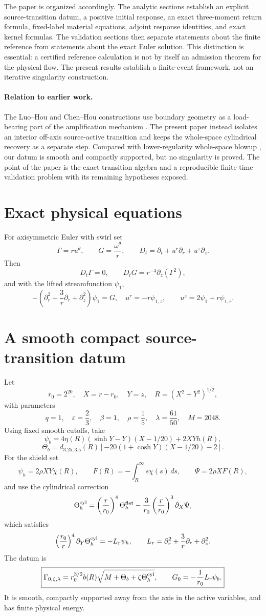 \documentclass[11pt]{article}
\theoremstyle{definition}\newtheorem{definition}[theorem]{Definition}\newtheorem{problem}[theorem]{Problem}
\theoremstyle{remark}\newtheorem{remark}[theorem]{Remark}
\begin{document}
The paper is organized accordingly.  The analytic sections establish an explicit source-transition datum, a positive initial response, an exact three-moment return formula, fixed-label material equations, adjoint response identities, and exact kernel formulas.  The validation sections then separate statements about the finite reference from statements about the exact Euler solution.  This distinction is essential: a certified reference calculation is not by itself an admission theorem for the physical flow.  The present results establish a finite-event framework, not an iterative singularity construction.

\paragraph{Relation to earlier work.}
The Luo--Hou and Chen--Hou constructions use boundary geometry as a load-bearing part of the amplification mechanism \cite{LuoHouPNAS2014,LuoHouMMS2014,ChenHou2025}.  The present paper instead isolates an interior off-axis source-active transition and keeps the whole-space cylindrical recovery as a separate step.  Compared with lower-regularity whole-space blowup \cite{Elgindi2021}, our datum is smooth and compactly supported, but no singularity is proved.  The point of the paper is the exact transition algebra and a reproducible finite-time validation problem with its remaining hypotheses exposed.
\section{Exact physical equations}
For axisymmetric Euler with swirl set
\[
\Gamma=ru^\theta,\qquad G=\frac{\omega^\theta}{r},\qquad
D_t=\partial_t+u^r\partial_r+u^z\partial_z.
\]
Then
\[
\boxed{D_t\Gamma=0},\qquad
\boxed{D_tG=r^{-4}\partial_z(\Gamma^2)},
\]
and with the lifted streamfunction $\psi_1$,
\[
-\left(\partial_r^2+\frac{3}{r}\partial_r+\partial_z^2\right)\psi_1=G,
\quad
u^r=-r\psi_{1,z},\qquad
u^z=2\psi_1+r\psi_{1,r}.
\]

\section{A smooth compact source-transition datum}
Let
\[
r_0=2^{20},\quad X=r-r_0,\quad Y=z,\quad R=(X^2+Y^2)^{1/2},
\]
with parameters
\[
q=1,\quad\varepsilon=\frac{2}{3},\quad\beta=1,\quad\rho=\frac{1}{5},
\quad\lambda=\frac{61}{50},\quad M=2048.
\]
Using fixed smooth cutoffs, take
\[
\psi_b=4\eta(R)(\sinh Y-Y)(X-1/20)+2XYh(R),
\]
\[
\Theta_b=d_{3.25,3.5}(R)\left[-20(1+\cosh Y)(X-1/20)-2\right].
\]
For the shield set
\[
\psi_h=2\rho XY\chi(R),\qquad
F(R)=-\int_R^\infty s\chi(s)\,ds,\qquad
\Psi=2\rho XF(R),
\]
and use the cylindrical correction
\[
\Theta_h^{\rm cyl}
=\left(\frac{r}{r_0}\right)^4\Theta_h^{\rm flat}
-\frac{3}{r_0}\left(\frac{r}{r_0}\right)^3\partial_X\Psi,
\]
which satisfies
\[
\left(\frac{r_0}{r}\right)^4\partial_Y\Theta_h^{\rm cyl}=-L_r\psi_h,
\qquad L_r=\partial_r^2+\frac{3}{r}\partial_r+\partial_z^2.
\]
The datum is
\[
\boxed{
\Gamma_{0,\zeta,\lambda}
=r_0^{3/2}b(R)\sqrt{M+\Theta_b+\zeta\Theta_h^{\rm cyl}},
\qquad
G_0=-\frac{1}{r_0}L_r\psi_b.}
\]
It is smooth, compactly supported away from the axis in the active variables,
and has finite physical energy.
\end{document}
